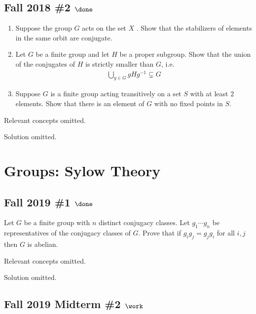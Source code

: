 \hypertarget{fall-2018-2-done}{%
\subsection{\texorpdfstring{Fall 2018 \#2
\(\done\)}{Fall 2018 \#2 \textbackslash done}}\label{fall-2018-2-done}}

\begin{enumerate}
\def\labelenumi{\alph{enumi}.}
\item
  Suppose the group \(G\) acts on the set \(X\) . Show that the
  stabilizers of elements in the same orbit are conjugate.
\item
  Let \(G\) be a finite group and let \(H\) be a proper subgroup. Show
  that the union of the conjugates of \(H\) is strictly smaller than
  \(G\), i.e.
  \begin{align*}
  \displaystyle\bigcup_{g\in G} gHg^{-1}\subsetneq G
  \end{align*}
\item
  Suppose \(G\) is a finite group acting transitively on a set \(S\)
  with at least 2 elements. Show that there is an element of \(G\) with
  no fixed points in \(S\).
\end{enumerate}

Relevant concepts omitted.

Solution omitted.

\hypertarget{groups-sylow-theory}{%
\section{Groups: Sylow Theory}\label{groups-sylow-theory}}

\hypertarget{fall-2019-1-done}{%
\subsection{\texorpdfstring{Fall 2019 \#1
\(\done\)}{Fall 2019 \#1 \textbackslash done}}\label{fall-2019-1-done}}

Let \(G\) be a finite group with \(n\) distinct conjugacy classes. Let
\(g_1 \cdots g_n\) be representatives of the conjugacy classes of \(G\).
Prove that if \(g_i g_j = g_j g_i\) for all \(i, j\) then \(G\) is
abelian.

Relevant concepts omitted.

Solution omitted.

\hypertarget{fall-2019-midterm-2-work}{%
\subsection{\texorpdfstring{Fall 2019 Midterm \#2
\(\work\)}{Fall 2019 Midterm \#2 \textbackslash work}}\label{fall-2019-midterm-2-work}}


